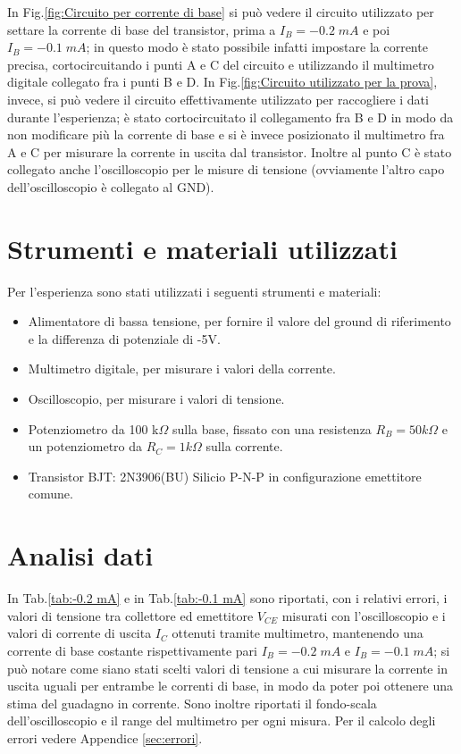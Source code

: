 \documentclass[a4paper, 11pt]{article}
\begin{document}
In Fig.\ref{fig:Circuito per corrente di base} si può vedere il circuito utilizzato per settare la corrente di base del transistor, prima a $I_B = -0.2 \; mA $ e poi $I_B = -0.1 \; mA$; in questo modo è stato possibile infatti impostare la corrente precisa, cortocircuitando i punti A e C del circuito e utilizzando il multimetro digitale collegato fra i punti B e D. In Fig.\ref{fig:Circuito utilizzato per la prova}, invece, si può vedere il circuito effettivamente utilizzato per raccogliere i dati durante l'esperienza; è stato cortocircuitato il collegamento fra B e D in modo da non modificare più la corrente di base e si è invece posizionato il multimetro fra A e C per misurare la corrente in uscita dal transistor. Inoltre al punto C è stato collegato anche l'oscilloscopio per le misure di tensione (ovviamente l'altro capo dell'oscilloscopio è collegato al GND).

\section{Strumenti e materiali utilizzati}
Per l'esperienza sono stati utilizzati i seguenti strumenti e materiali:
\begin{itemize}
    \item Alimentatore di bassa tensione, per fornire il valore del ground di riferimento e la differenza di potenziale di -5V.
    \item Multimetro digitale, per misurare i valori della corrente.
    \item Oscilloscopio, per misurare i valori di tensione.
    \item Potenziometro da 100 k$\Omega$ sulla base, fissato con una resistenza $R_B = 50 k\Omega$ e un potenziometro da $R_C = 1 k\Omega$ sulla corrente.
    \item Transistor BJT: 2N3906(BU) Silicio P-N-P in configurazione emettitore comune.
\end{itemize}

\section{Analisi dati}
In Tab.\ref{tab:-0.2 mA} e in Tab.\ref{tab:-0.1 mA} sono riportati, con i relativi errori, i valori di tensione tra collettore ed emettitore $V_{CE}$ misurati con l'oscilloscopio e i valori di corrente di uscita $I_C$ ottenuti tramite multimetro, mantenendo una corrente di base costante rispettivamente pari $I_B = -0.2 \;mA $ e $I_B = -0.1 \;mA $; si può notare come siano stati scelti valori di tensione a cui misurare la corrente in uscita uguali per entrambe le correnti di base, in modo da poter poi ottenere una stima del guadagno in corrente. Sono inoltre riportati il fondo-scala dell'oscilloscopio e il range del multimetro per ogni misura. Per il calcolo degli errori vedere Appendice \ref{sec:errori}.
\end{document}
